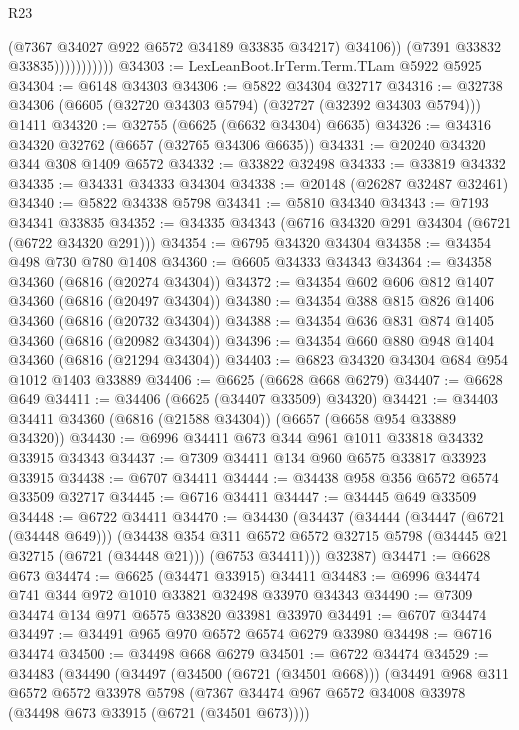 \begin{lexlean}{R23}
\begin{coremodule}
                            (@7367 @34027 @922 @6572 @34189 @33835 @34217)
                            @34106))
                        (@7391 @33832 @33835)))))))))))
@34303 := LexLeanBoot.IrTerm.Term.TLam @5922 @5925
@34304 := @6148 @34303
@34306 := @5822 @34304 @32717
@34316 := @32738 @34306 (@6605 (@32720 @34303 @5794) (@32727 (@32392 @34303 @5794))) @1411
@34320 := @32755 (@6625 (@6632 @34304) @6635)
@34326 := @34316 @34320 @32762 (@6657 (@32765 @34306 @6635))
@34331 := @20240 @34320 @344 @308 @1409 @6572
@34332 := @33822 @32498
@34333 := @33819 @34332
@34335 := @34331 @34333 @34304
@34338 := @20148 (@26287 @32487 @32461)
@34340 := @5822 @34338 @5798
@34341 := @5810 @34340
@34343 := @7193 @34341 @33835
@34352 := @34335 @34343 (@6716 @34320 @291 @34304 (@6721 (@6722 @34320 @291)))
@34354 := @6795 @34320 @34304
@34358 := @34354 @498 @730 @780 @1408
@34360 := @6605 @34333 @34343
@34364 := @34358 @34360 (@6816 (@20274 @34304))
@34372 := @34354 @602 @606 @812 @1407 @34360 (@6816 (@20497 @34304))
@34380 := @34354 @388 @815 @826 @1406 @34360 (@6816 (@20732 @34304))
@34388 := @34354 @636 @831 @874 @1405 @34360 (@6816 (@20982 @34304))
@34396 := @34354 @660 @880 @948 @1404 @34360 (@6816 (@21294 @34304))
@34403 := @6823 @34320 @34304 @684 @954 @1012 @1403 @33889
@34406 := @6625 (@6628 @668 @6279)
@34407 := @6628 @649
@34411 := @34406 (@6625 (@34407 @33509) @34320)
@34421 := @34403 @34411 @34360 (@6816 (@21588 @34304)) (@6657 (@6658 @954 @33889 @34320))
@34430 := @6996 @34411 @673 @344 @961 @1011 @33818 @34332 @33915 @34343
@34437 := @7309 @34411 @134 @960 @6575 @33817 @33923 @33915
@34438 := @6707 @34411
@34444 := @34438 @958 @356 @6572 @6574 @33509 @32717
@34445 := @6716 @34411
@34447 := @34445 @649 @33509
@34448 := @6722 @34411
@34470 := @34430
    (@34437
      (@34444
        (@34447 (@6721 (@34448 @649)))
        (@34438
          @354
          @311
          @6572
          @6572
          @32715
          @5798
          (@34445 @21 @32715 (@6721 (@34448 @21)))
          (@6753 @34411)))
      @32387)
@34471 := @6628 @673
@34474 := @6625 (@34471 @33915) @34411
@34483 := @6996 @34474 @741 @344 @972 @1010 @33821 @32498 @33970 @34343
@34490 := @7309 @34474 @134 @971 @6575 @33820 @33981 @33970
@34491 := @6707 @34474
@34497 := @34491 @965 @970 @6572 @6574 @6279 @33980
@34498 := @6716 @34474
@34500 := @34498 @668 @6279
@34501 := @6722 @34474
@34529 := @34483
    (@34490
      (@34497
        (@34500 (@6721 (@34501 @668)))
        (@34491
          @968
          @311
          @6572
          @6572
          @33978
          @5798
          (@7367 @34474 @967 @6572 @34008 @33978 (@34498 @673 @33915 (@6721 (@34501 @673))))

\end{coremodule}
\end{lexlean}
